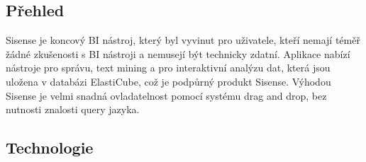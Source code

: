 \documentclass[czech,BP]{thesiskiv2}
\begin{document}
 \subsection{Přehled}

 Sisense je koncový BI nástroj, který byl vyvinut pro uživatele, kteří nemají téměř žádné zkušenosti s BI nástroji a nemusejí být technicky zdatní. Aplikace nabízí nástroje pro správu, text mining a pro interaktivní analýzu dat, která jsou uložena v databázi ElastiCube, což je podpůrný produkt Sisense. Výhodou Sisense je velmi snadná ovladatelnost pomocí systému drag and drop, bez nutnosti znalosti query jazyka.
 \subsection{Technologie}
 
\end{document}
